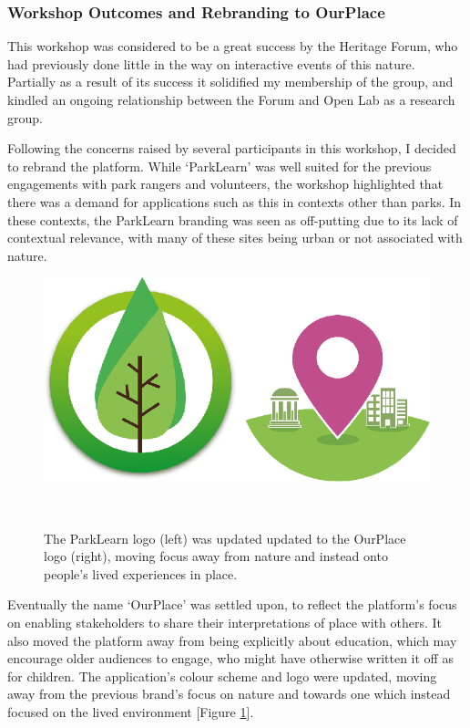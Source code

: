 \subsubsection{Workshop Outcomes and Rebranding to OurPlace}
This workshop was considered to be a great success by the Heritage Forum, who had previously done little in the way on interactive events of this nature. Partially as a result of its success it solidified my membership of the group, and kindled an ongoing relationship between the Forum and Open Lab as a research group.

Following the concerns raised by several participants in this workshop, I decided to rebrand the platform. While `ParkLearn' was well suited for the previous engagements with park rangers and volunteers, the workshop highlighted that there was a demand for applications such as this in contexts other than parks. In these contexts, the ParkLearn branding was seen as off-putting due to its lack of contextual relevance, with many of these sites being urban or not associated with nature. 

\begin{figure}
  \centering
  \includegraphics[width=0.8\columnwidth]{images/chapter06/logos.png}
  \caption[The ParkLearn and OurPlace Logos]{The ParkLearn logo (left) was updated updated to the OurPlace logo (right), moving focus away from nature and instead onto people's lived experiences in place.}~\label{fig:AppLogos}
\end{figure}

Eventually the name `OurPlace' was settled upon, to reflect the platform's focus on enabling stakeholders to share their interpretations of place with others. It also moved the platform away from being explicitly about education, which may encourage older audiences to engage, who might have otherwise written it off as for children. The application's colour scheme and logo were updated, moving away from the previous brand's focus on nature and towards one which instead focused on the lived environment [Figure \ref{fig:AppLogos}].

